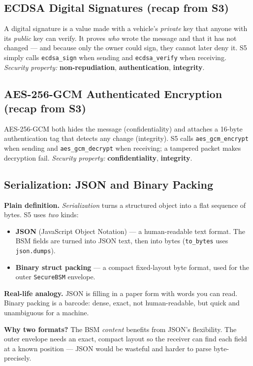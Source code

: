 \documentclass[11pt,a4paper]{article}
\begin{document}
\subsection{ECDSA Digital Signatures (recap from S3)}
A digital signature is a value made with a vehicle's \emph{private} key that
anyone with its \emph{public} key can verify. It proves \emph{who} wrote the
message and that it has not changed --- and because only the owner could sign,
they cannot later deny it. S5 simply calls \texttt{ecdsa\_sign} when sending and
\texttt{ecdsa\_verify} when receiving. \emph{Security property:}
\textbf{non-repudiation}, \textbf{authentication}, \textbf{integrity}.

\subsection{AES-256-GCM Authenticated Encryption (recap from S3)}
AES-256-GCM both hides the message (confidentiality) and attaches a 16-byte
authentication tag that detects any change (integrity). S5 calls
\texttt{aes\_gcm\_encrypt} when sending and \texttt{aes\_gcm\_decrypt} when
receiving; a tampered packet makes decryption fail. \emph{Security property:}
\textbf{confidentiality}, \textbf{integrity}.

\subsection{Serialization: JSON and Binary Packing}
\textbf{Plain definition.} \emph{Serialization} turns a structured object into a
flat sequence of bytes. S5 uses \emph{two} kinds:
\begin{itemize}
  \item \textbf{JSON} (JavaScript Object Notation) --- a human-readable text
        format. The BSM fields are turned into JSON text, then into bytes
        (\texttt{to\_bytes} uses \texttt{json.dumps}).
  \item \textbf{Binary struct packing} --- a compact fixed-layout byte format,
        used for the outer \texttt{SecureBSM} envelope.
\end{itemize}

\textbf{Real-life analogy.} JSON is filling in a paper form with words you can
read. Binary packing is a barcode: dense, exact, not human-readable, but quick
and unambiguous for a machine.

\textbf{Why two formats?} The BSM \emph{content} benefits from JSON's
flexibility. The outer envelope needs an exact, compact layout so the receiver
can find each field at a known position --- JSON would be wasteful and harder to
parse byte-precisely.
\end{document}
